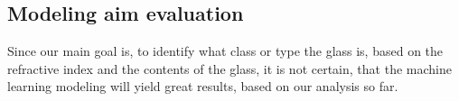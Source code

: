 \subsection{Modeling aim evaluation}
Since our main goal is, to identify what class or type the glass is, based on the refractive index and the contents of the glass, it is not certain, that the machine learning modeling will yield great results, based on our analysis so far.